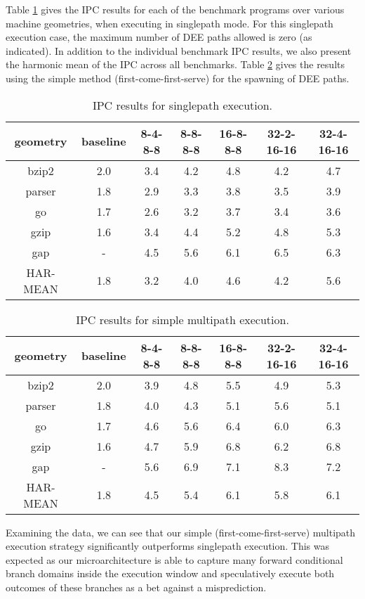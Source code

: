 \documentclass[10pt,dvips]{article}
\begin{document}
Table \ref{tab:ipc1} gives the IPC results for each of the benchmark
programs over various machine geometries, when executing in
singlepath mode.
For this singlepath execution case,
the maximum number of DEE paths allowed is zero (as indicated).
In addition to the individual benchmark IPC results, we also
present the harmonic mean of the IPC across all benchmarks.
Table \ref{tab:ipc2} gives the results using the simple method 
(first-come-first-serve) for
the spawning of DEE paths.
%
\begin{table}
\begin{center}
\caption{IPC results for singlepath execution.}
\label{tab:ipc1}
\begin{tabular}{|c|c|c|c|c|c|c|}
\hline 
geometry&baseline&
8-4-8-8&
8-8-8-8&
16-8-8-8&
32-2-16-16&
32-4-16-16\\
\hline 
\hline
bzip2&2.0&3.4&4.2&4.8&4.2&4.7\\
\hline 
parser&1.8&2.9&3.3&3.8&3.5&3.9\\
\hline 
go&1.7&2.6&3.2&3.7&3.4&3.6\\
\hline 
gzip&1.6&3.4&4.4&5.2&4.8&5.3\\
\hline 
gap&-&4.5&5.6&6.1&6.5&6.3\\
\hline
\hline 
HAR-MEAN&1.8&3.2&4.0&4.6&4.2&5.6\\
\hline
\end{tabular}
\end{center}
\end{table}
%
\begin{table}
\begin{center}
\caption{IPC results for simple multipath execution.}
\label{tab:ipc2}
\begin{tabular}{|c|c|c|c|c|c|c|}
\hline 
geometry&baseline&
8-4-8-8&
8-8-8-8&
16-8-8-8&
32-2-16-16&
32-4-16-16\\
\hline 
\hline 
bzip2&2.0&3.9&4.8&5.5&4.9&5.3\\
\hline 
parser&1.8&4.0&4.3&5.1&5.6&5.1\\
\hline 
go&1.7&4.6&5.6&6.4&6.0&6.3\\
\hline 
gzip&1.6&4.7&5.9&6.8&6.2&6.8\\
\hline 
gap&-&5.6&6.9&7.1&8.3&7.2\\
\hline 
\hline 
HAR-MEAN&1.8&4.5&5.4&6.1&5.8&6.1\\
\hline
\end{tabular}
\end{center}
\end{table}
%

Examining the data, we can see that our simple 
(first-come-first-serve)
multipath execution
strategy significantly outperforms singlepath execution.
This was expected as our microarchitecture is able to
capture many forward conditional branch domains inside the execution
window and speculatively execute both outcomes of these branches
as a bet against a misprediction.
\end{document}
